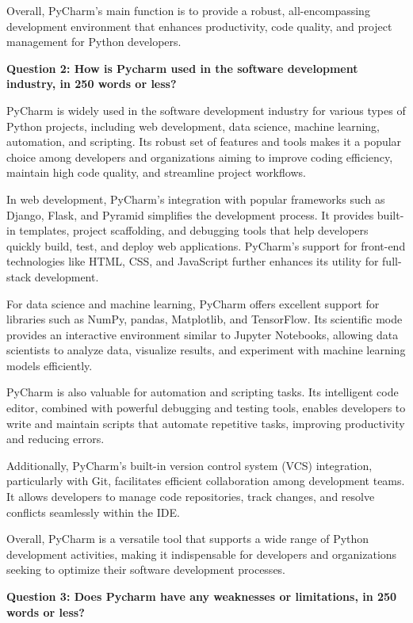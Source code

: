 \documentclass[a4paper, 11pt]{report}
\begin{document}
Overall, PyCharm’s main function is to provide a robust, all-encompassing development environment that enhances productivity, code quality, and project management for Python developers.

\vspace{\baselineskip}
\textbf{Question 2: How is Pycharm used in the software development industry, in 250 words or less?}

PyCharm is widely used in the software development industry for various types of Python projects, including web development, data science, machine learning, automation, and scripting. Its robust set of features and tools makes it a popular choice among developers and organizations aiming to improve coding efficiency, maintain high code quality, and streamline project workflows.

In web development, PyCharm's integration with popular frameworks such as Django, Flask, and Pyramid simplifies the development process. It provides built-in templates, project scaffolding, and debugging tools that help developers quickly build, test, and deploy web applications. PyCharm's support for front-end technologies like HTML, CSS, and JavaScript further enhances its utility for full-stack development.

For data science and machine learning, PyCharm offers excellent support for libraries such as NumPy, pandas, Matplotlib, and TensorFlow. Its scientific mode provides an interactive environment similar to Jupyter Notebooks, allowing data scientists to analyze data, visualize results, and experiment with machine learning models efficiently.

PyCharm is also valuable for automation and scripting tasks. Its intelligent code editor, combined with powerful debugging and testing tools, enables developers to write and maintain scripts that automate repetitive tasks, improving productivity and reducing errors.

Additionally, PyCharm's built-in version control system (VCS) integration, particularly with Git, facilitates efficient collaboration among development teams. It allows developers to manage code repositories, track changes, and resolve conflicts seamlessly within the IDE.

Overall, PyCharm is a versatile tool that supports a wide range of Python development activities, making it indispensable for developers and organizations seeking to optimize their software development processes.

\vspace{\baselineskip}
\textbf{Question 3: Does Pycharm have any weaknesses or limitations, in 250 words or less?}
\end{document}
